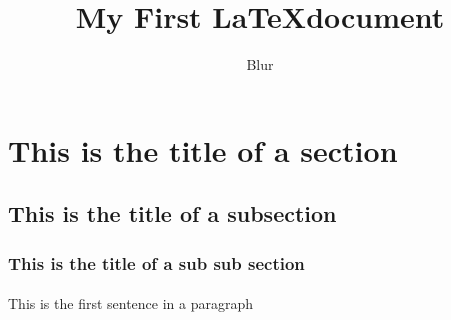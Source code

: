\documentclass{article}
\begin{document}
\author{Blur}
\title{My First \LaTeX document}
\maketitle

\section{This is the title of a section}
\subsection{This is the title of a subsection}
\subsubsection{This is the title of a sub sub section}
\paragraph{}
This is the first sentence in a paragraph
\end{document}
